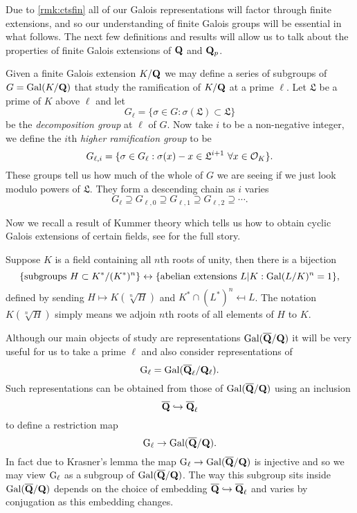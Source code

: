 \documentclass[a4paper,12pt]{article}
\begin{document}
Due to \cref{rmk:ctsfin} all of our Galois representations will factor through finite extensions, and so our understanding of finite Galois groups will be essential in what follows.
The next few definitions and results will allow us to talk about the properties of finite Galois extensions of $\mathbf{Q}$ and $\mathbf{Q}_p$.

\begin{defn}\label{def:higher}
Given a finite Galois extension $K/\mathbf{Q}$ we may define a series of subgroups of $G = \operatorname{Gal}(K/\mathbf{Q})$ that study the ramification of $K/\mathbf{Q}$ at a prime $\ell$. %
Let $\mathfrak{L}$ be a prime of $K$ above $\ell$ and let
\[
G_\ell =\{\sigma \in G : \sigma(\mathfrak{L}) \subset \mathfrak{L}\}
\]
be the \emph{decomposition group} at $\ell$ of $G$.
Now take $i$ to be a non-negative integer, we define the $i$th \emph{higher ramification group} to be
\[
G_{\ell,i} = \{\sigma \in G_\ell : \sigma(x) - x \in \mathfrak{L}^{i + 1}\ \forall x \in \mathcal{O}_{K} \}.
\]
These groups tell us how much of the whole of $G$ we are seeing if we just look modulo powers of $\mathfrak{L}$.
They form a descending chain as $i$ varies
\[
G_\ell\supseteq G_{\ell,0} \supseteq G_{\ell,1} \supseteq G_{\ell, 2}\supseteq\cdots.
\]
\end{defn}

Now we recall a result of Kummer theory which tells us how to obtain cyclic Galois extensions of certain fields, see \cite{Birch} for the full story.

\begin{prop}\label{prop:kummer}
Suppose $K$ is a field containing all $n$th roots of unity, then there is a bijection
\[
\{\text{subgroups }H \subset K^*/(K^*)^n\} \leftrightarrow \{\text{abelian extensions } L| K : \operatorname{Gal}(L/K)^n = 1\},
\]
defined by sending $H\mapsto K(\sqrt[n]{H})$ and $K^* \cap (L^*)^n\mapsfrom L$.
The notation $K(\sqrt[n]{H})$ simply means we adjoin $n$th roots of all elements of $H$ to $K$.
\end{prop}

Although our main objects of study are representations $\operatorname{Gal}(\overline{\mathbf{Q}}/\mathbf{Q})$ it will be very useful for us to take a prime $\ell$ and also consider representations of
\[
\mathrm{G}_\ell = \operatorname{Gal}(\overline{\mathbf{Q}}_\ell/\mathbf{Q}_\ell).
\]
Such representations can be obtained from those of $\operatorname{Gal}(\overline{\mathbf{Q}}/\mathbf{Q})$ using an inclusion
\[
\overline{\mathbf{Q}} \hookrightarrow \overline{\mathbf{Q}}_\ell
\]
to define a restriction map
\[
\mathrm{G}_\ell \to \operatorname{Gal}(\overline{\mathbf{Q}}/\mathbf{Q}).
\]
In fact due to Krasner's lemma \cite[p. 238]{Cohen} the map $\mathrm{G}_\ell \to \operatorname{Gal}(\overline{\mathbf{Q}}/\mathbf{Q})$ is injective and so we may view $\mathrm{G}_\ell$ as a subgroup of $\operatorname{Gal}(\overline{\mathbf{Q}}/\mathbf{Q})$.
The way this subgroup sits inside $\operatorname{Gal}(\overline{\mathbf{Q}}/\mathbf{Q})$ depends on the choice of embedding $\overline{\mathbf{Q}} \hookrightarrow \overline{\mathbf{Q}}_\ell$ and varies by conjugation as this embedding changes.
\end{document}
